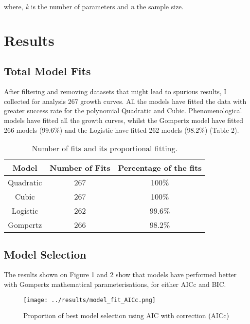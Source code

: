 \documentclass[11]{article}
\begin{document}
where, \emph{k} is the number of parameters and \emph{n} the sample size.



\section{Results}

\subsection{Total Model Fits}

After filtering and removing datasets that might lead to spurious results, I collected for analysis 267 growth curves. All the models have fitted the data with greater success rate for the polynomial Quadratic and Cubic. Phenomenological models have fitted all the growth curves, whilst the Gompertz model have fitted 266 models (99.6\%) and the Logistic have fitted 262 models (98.2\%) (Table 2).

\begin{table}[H]
    \caption{Number of fits and its proportional fitting.}
    \centering
    \begin{tabular}{ccc}
    \hline
    Model & Number of Fits  & Percentage of the fits \\ 
    \hline
    \hline
     Quadratic & 267 & 100\% \\
     Cubic & 267 & 100\% \\
     Logistic & 262 & 99.6\% \\
     Gompertz & 266 & 98.2\%
    \end{tabular}
\end{table}

\subsection{Model Selection}

The results shown on Figure 1 and 2 show that models have performed better with Gompertz mathematical parameterisations, for either AICc and BIC.



\begin{figure}[H]
      \begin{center}
      \texttt{[image: ../results/model\_fit\_AICc.png]}
      \caption{Proportion of best model selection using AIC with correction (AICc)}
      \label{fig:AICc}
      \end{center}
\end{figure}
\end{document}
